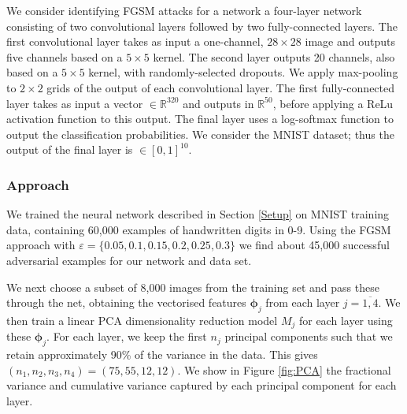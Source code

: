 \par 

We consider identifying FGSM attacks for a network a four-layer network consisting of two convolutional layers followed by two fully-connected layers. The first convolutional layer takes as input a one-channel, $28\times 28$ image and outputs five channels based on a $5\times 5$ kernel. The second layer outputs 20 channels, also based on a $5\times 5$ kernel, with randomly-selected dropouts. We apply max-pooling to $2\times 2$ grids of the output of each convolutional layer. The first fully-connected layer takes as input a vector $\in \mathbb{R}^{320}$ and outputs in $\mathbb{R}^{50}$, before applying a ReLu activation function to this output. The final layer uses a log-softmax function to output the classification probabilities. We consider the MNIST dataset; thus the output of the final layer is $\in [0,1]^{10}$.

\subsubsection{Approach}

We trained the neural network described in Section \ref{Setup} on MNIST training data, containing 60,000 examples of handwritten digits in 0-9.  Using the FGSM approach with $\varepsilon =\{0.05,0.1,0.15,0.2,0.25,0.3\}$ we find about 45,000 successful adversarial examples for our network and data set.
\par
We next choose a subset of 8,000 images from the training set and pass these through the net, obtaining the vectorised features $\boldsymbol{\phi}_{j}$ from each layer $j=\overline{1,4}$. We then train a linear PCA dimensionality reduction model $M_j$ for each layer using these $\boldsymbol{\phi}_j$. For each layer, we keep the first $n_j$ principal components such that we retain approximately 90\% of the variance in the data. This gives $(n_1, n_2, n_3, n_4) = (75, 55, 12, 12)$. We show in Figure \ref{fig:PCA} the fractional variance and cumulative variance captured by each principal component for each layer.

